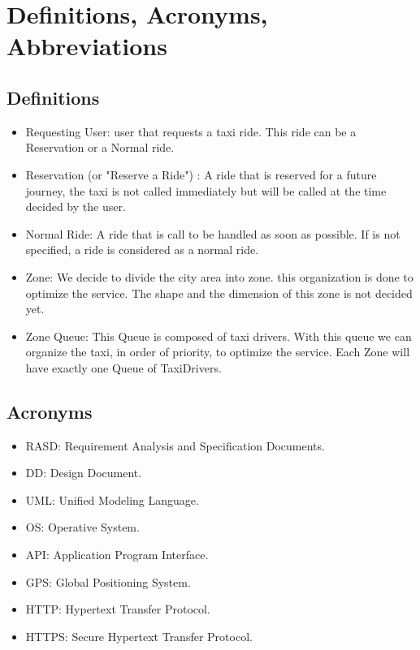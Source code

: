 	\section{Definitions, Acronyms, Abbreviations}
		
		\subsection{Definitions}
			\begin{itemize} 
			
				\item Requesting User: user that requests a taxi ride. This ride can be a Reservation or a Normal ride.
				
				\item Reservation (or "Reserve a Ride") : A ride that is reserved for a future journey, the taxi is not called immediately but will be called at the time decided by the user.
				
				\item Normal Ride: A ride that is call to be handled as soon as possible. If is not specified, a ride is considered as a normal ride.
				
				\item Zone: We decide to divide the city area into zone. this organization is done to optimize the service. The shape and the dimension of this zone is not decided yet.
				
				\item Zone Queue: This Queue is composed of taxi drivers. With this queue we can organize the taxi, in order of priority, to optimize the service. Each Zone will have exactly one Queue of TaxiDrivers.
			\end{itemize}

		\subsection{Acronyms}
			\begin{itemize}
				\item RASD: Requirement Analysis and Specification Documents.
				\item DD: Design Document.
				\item UML: Unified Modeling Language.
				\item OS: Operative System.
				\item API: Application Program Interface.
				\item GPS: Global Positioning System.
				\item HTTP: Hypertext Transfer Protocol.
				\item HTTPS: Secure Hypertext Transfer Protocol.
			\end{itemize}

